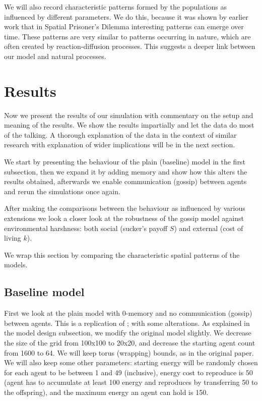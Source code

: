 \documentclass[english]{article}
\begin{document}
We will also record characteristic patterns formed by the populations as influenced by different parameters.
We do this, because it was shown by earlier work \citep{spatial-patterns} that in Spatial Prisoner's Dilemma interesting patterns can emerge over time.
These patterns are very similar to patterns occurring in nature, which are often created by reaction-diffusion processes.
This suggests a deeper link between our model and natural processes.



\section{Results}
Now we present the results of our simulation
with commentary on the setup and meaning of the results.
We show the results impartially and let the data do most of the talking.
A thorough explanation of the data in the context of similar research
with explanation of wider implications will be in the next section.

We start by presenting the behaviour of the plain (baseline) model in the first subsection,
then we expand it by adding memory and show how this alters the results obtained,
afterwards we enable communication (gossip) between agents and rerun the simulations once again.

After making the comparisons between the behaviour as influenced by various extensions we look a closer look at the robustness of the gossip model against environmental harshness: both social (sucker's payoff $S$) and external (cost of living $k$).

We wrap this section by comparing the characteristic spatial patterns of the models.


\subsection{Baseline model}
First we look at the plain model with 0-memory and no communication (gossip) between agents.
This is a replication of \citet{smaldino}; with some alterations.
As explained in the model design subsection, we modify the original model slightly.
We decrease the size of the grid from 100x100 to 20x20,
and decrease the starting agent count from 1600 to 64.
We will keep torus (wrapping) bounds, as in the original paper.
We will also keep some other parameters:
starting energy will be randomly chosen for each agent to be between 1 and 49 (inclusive),
energy cost to reproduce is 50 (agent has to accumulate at least 100 energy and reproduces by transferring 50 to the offspring),
and the maximum energy an agent can hold is 150.
\end{document}
